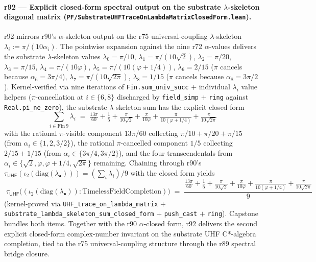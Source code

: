 \documentclass[11pt,a4paper]{amsart}
\theoremstyle{plain}
\theoremstyle{definition}
\begin{document}
\paragraph{r92 --- Explicit closed-form spectral output on the substrate $\lambda$-skeleton diagonal matrix (\texttt{PF/SubstrateUHFTraceOnLambdaMatrixClosedForm.lean}).} r92 mirrors r90's $\alpha$-skeleton output on the r75 universal-coupling $\lambda$-skeleton $\lambda_i := \pi/(10 \alpha_i)$. The pointwise expansion against the nine r72 $\alpha$-values delivers the substrate $\lambda$-skeleton values $\lambda_0 = \pi/10$, $\lambda_1 = \pi/(10\sqrt{2})$, $\lambda_2 = \pi/20$, $\lambda_3 = \pi/15$, $\lambda_4 = \pi/(10\varphi)$, $\lambda_5 = \pi/(10(\varphi + 1/4))$, $\lambda_6 = 2/15$ ($\pi$ cancels because $\alpha_6 = 3\pi/4$), $\lambda_7 = \pi/(10\sqrt{2\pi})$, $\lambda_8 = 1/15$ ($\pi$ cancels because $\alpha_8 = 3\pi/2$). Kernel-verified via nine iterations of \texttt{Fin.sum\_univ\_succ} $+$ individual $\lambda_i$ value helpers ($\pi$-cancellation at $i \in \{6, 8\}$ discharged by \texttt{field\_simp} $+$ \texttt{ring} against \texttt{Real.pi\_ne\_zero}), the substrate $\lambda$-skeleton sum has the explicit closed form
\[
\sum_{i \in \mathrm{Fin}~9} \lambda_i \;=\; \tfrac{13\pi}{60} + \tfrac{1}{5} + \tfrac{\pi}{10\sqrt{2}} + \tfrac{\pi}{10\varphi} + \tfrac{\pi}{10(\varphi + 1/4)} + \tfrac{\pi}{10\sqrt{2\pi}}
\]
with the rational $\pi$-visible component $13\pi/60$ collecting $\pi/10 + \pi/20 + \pi/15$ (from $\alpha_i \in \{1, 2, 3/2\}$), the rational $\pi$-cancelled component $1/5$ collecting $2/15 + 1/15$ (from $\alpha_i \in \{3\pi/4, 3\pi/2\}$), and the four transcendentals from $\alpha_i \in \{\sqrt{2}, \varphi, \varphi + 1/4, \sqrt{2\pi}\}$ remaining. Chaining through r90's $\tau_{\textsf{UHF}}(\iota_2(\mathrm{diag}(\lambda_\bullet))) = (\sum_i \lambda_i)/9$ with the closed form yields
\[
\boxed{\; \tau_{\textsf{UHF}}\bigl((\iota_2(\mathrm{diag}(\lambda_\bullet)) : \mathrm{TimelessFieldCompletion})\bigr) \;=\; \frac{\tfrac{13\pi}{60} + \tfrac{1}{5} + \tfrac{\pi}{10\sqrt{2}} + \tfrac{\pi}{10\varphi} + \tfrac{\pi}{10(\varphi + 1/4)} + \tfrac{\pi}{10\sqrt{2\pi}}}{9} \;}
\]
(kernel-proved via \texttt{UHF\_trace\_on\_lambda\_matrix} $+$ \texttt{substrate\_lambda\_skeleton\_sum\_closed\_form} $+$ \texttt{push\_cast} $+$ \texttt{ring}). Capstone  bundles both items. Together with the r90 $\alpha$-closed form, r92 delivers the second explicit closed-form complex-number invariant on the substrate UHF C*-algebra completion, tied to the r75 universal-coupling structure through the r89 spectral bridge closure.
\end{document}
